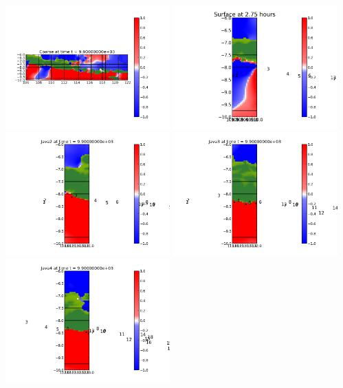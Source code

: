 \documentclass[11pt]{article}
\begin{document}
\vskip 10pt 
\includegraphics[width=0.475\textwidth]{frame0011fig0.png}
\includegraphics[width=0.475\textwidth]{frame0011fig15.png}
\vskip 10pt 
\includegraphics[width=0.475\textwidth]{frame0011fig25.png}
\includegraphics[width=0.475\textwidth]{frame0011fig20.png}
\vskip 10pt 
\includegraphics[width=0.475\textwidth]{frame0011fig30.png}
\end{document}
